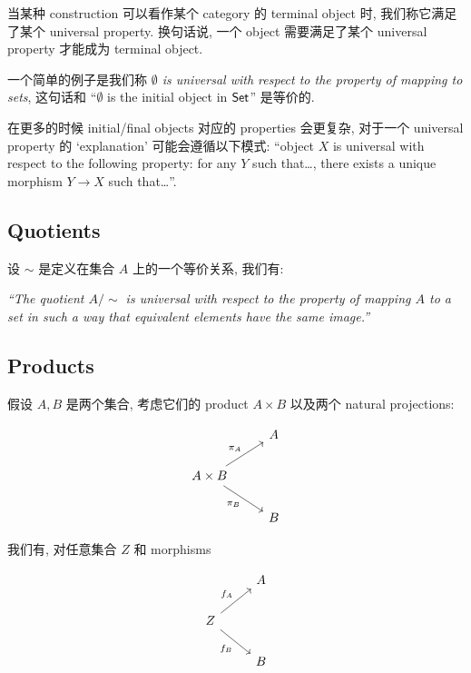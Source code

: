当某种 construction 可以看作某个 category 的 terminal object 时, 我们称它满足了某个 universal property. 换句话说, 一个 object 需要满足了某个 universal property 才能成为 terminal object.

一个简单的例子是我们称 \emph{\(\emptyset\) is universal with respect to the property of mapping to sets}, 这句话和 ``\(\emptyset\) is the initial object in \(\operatorname{\mathsf{Set}}\)'' 是等价的.

在更多的时候 initial/final objects 对应的 properties 会更复杂, 对于一个 universal property 的 `explanation' 可能会遵循以下模式: ``object \(X\) is universal with respect to the following property: for any \(Y\) such that\dots, there exists a unique morphism \(Y \to X\) such that\dots''.

\subsection{Quotients}\label{sec:1.5.3}

设 \(\sim \) 是定义在集合 \(A\) 上的一个等价关系, 我们有:

\emph{``The quotient \(A/\sim \) is universal with respect to the property of mapping \(A\) to a set in such a way that equivalent elements have the same image.''}

\subsection{Products}\label{sec:1.5.4}

假设 \(A, B\) 是两个集合, 考虑它们的 product \(A \times B\) 以及两个 natural projections:

\[\begin{tikzcd}
        & A \\
        {A \times B} \\
        & B
        \arrow["{\pi_A}", from=2-1, to=1-2]
        \arrow["{\pi_B}"', from=2-1, to=3-2]
    \end{tikzcd}\]

我们有, 对任意集合 \(Z\) 和 morphisms

\[\begin{tikzcd}
        & A \\
        Z \\
        & B
        \arrow["{f_A}", from=2-1, to=1-2]
        \arrow["{f_B}"', from=2-1, to=3-2]
    \end{tikzcd}\]


